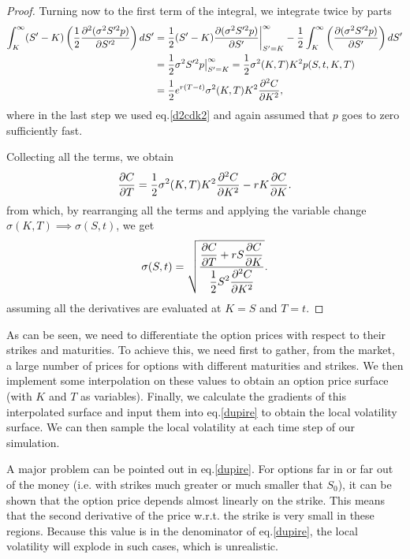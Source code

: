 \begin{proof}
Turning now to the first term of the integral, we integrate twice by parts
\begin{equation}
\begin{split}
\int_K^\infty(S'-K)\left(\frac{1}{2}\pdv{^2(\sigma^2S'^2p)}{S'^2}\right)dS'&=\frac{1}{2}(S'-K)\pdv{(\sigma^2S'^2p)}{S'}\bigg|_{S'=K}^\infty-\frac{1}{2}\int_K^\infty\left(\pdv{(\sigma^2S'^2p)}{S'}\right)dS'\\
&=\frac{1}{2}\sigma^2S'^2p\big|_{S'=K}^\infty=\frac{1}{2}\sigma^2(K,T)K^2p(S,t,K,T)\\
&=\frac{1}{2}e^{r(T-t)}\sigma^2(K,T)K^2\pdv{^2C}{K^2},
\end{split}
\end{equation}
\noindent where in the last step we used eq.\eqref{d2cdk2} and again assumed that $p$ goes to zero sufficiently fast.

Collecting all the terms, we obtain
\begin{equation}
\pdv{C}{T}=\frac{1}{2}\sigma^2(K,T)K^2\pdv{^2C}{K^2}-rK\pdv{C}{K}.
\end{equation}
\noindent from which, by rearranging all the terms and applying the variable change $\sigma(K,T)\implies \sigma(S,t)$, we get
\begin{equation}
\sigma(S,t)=\sqrt{\frac{\displaystyle\pdv{C}{T}+rS\pdv{C}{K}}{\displaystyle\frac{1}{2}S^2\pdv{^2C}{K^2}}}.
\end{equation}
\noindent assuming all the derivatives are evaluated at $K=S$ and $T=t$.

\end{proof}

As can be seen, we need to differentiate the option prices with respect to their strikes and maturities. To achieve this, we need first to gather, from the market, a large number of prices for options with different maturities and strikes. We then implement some interpolation on these values to obtain an option price surface (with $K$ and $T$ as variables). Finally, we calculate the gradients of this interpolated surface and input them into eq.\eqref{dupire} to obtain the local volatility surface.
We can then sample the local volatility at each time step of our simulation.


A major problem can be pointed out in eq.\eqref{dupire}. For options far in or far out of the money (i.e. with strikes much greater or much smaller that $S_0$), it can be shown that the option price depends almost linearly on the strike. This means that the second derivative of the price w.r.t. the strike is very small in these regions. Because this value is in the denominator of eq.\eqref{dupire}, the local volatility will explode in such cases, which is unrealistic.


